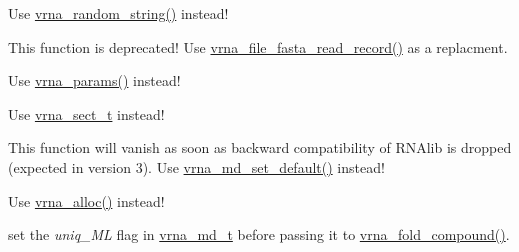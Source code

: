 \begin{DoxyRefList}
\item[\label{deprecated__deprecated000126}%
\hypertarget{deprecated__deprecated000126}{}%
Global \hyperlink{string__utils_8h_a1b95eac365a021572e1c37e5993a89be}{random\-\_\-string} (int l, const char symbols\mbox{[}\mbox{]})]Use \hyperlink{group__string__utils_ga4eeb3750dcf860b9f3158249f95dbd7f}{vrna\-\_\-random\-\_\-string()} instead!  
\item[\label{deprecated__deprecated000061}%
\hypertarget{deprecated__deprecated000061}{}%
Global \hyperlink{group__file__utils_gafd194a69af9d92b5b0412a7627ac1595}{read\-\_\-record} (char $\ast$$\ast$header, char $\ast$$\ast$sequence, char $\ast$$\ast$$\ast$rest, unsigned int options)]This function is deprecated! Use \hyperlink{group__file__utils_ga8cfb7e271efc9e1f34640acb85475639}{vrna\-\_\-file\-\_\-fasta\-\_\-read\-\_\-record()} as a replacment. 
\item[\label{deprecated__deprecated000090}%
\hypertarget{deprecated__deprecated000090}{}%
Global \hyperlink{group__energy__parameters_ga541f2cf7436e9bc939b0a49b24baf987}{scale\-\_\-parameters} (void)]Use \hyperlink{group__energy__parameters_gad0e3e7e74bdc50d1709d40c92993185e}{vrna\-\_\-params()} instead! 
\item[\label{deprecated__deprecated000045}%
\hypertarget{deprecated__deprecated000045}{}%
Global \hyperlink{group__data__structures_gaaacedee1f05d3d45aa6764eca51a8876}{sect} ]Use \hyperlink{group__data__structures_gacc9cdae790dac75a7024e7069c0d4400}{vrna\-\_\-sect\-\_\-t} instead!  
\item[\label{deprecated__deprecated000082}%
\hypertarget{deprecated__deprecated000082}{}%
Global \hyperlink{group__model__details_gabad896c3650d420f3f3ddefc69e2bceb}{set\-\_\-model\-\_\-details} (vrna\-\_\-md\-\_\-t $\ast$md)]This function will vanish as soon as backward compatibility of R\-N\-Alib is dropped (expected in version 3). Use \hyperlink{group__model__details_ga8ac6ff84936282436f822644bf841f66}{vrna\-\_\-md\-\_\-set\-\_\-default()} instead! 
\item[\label{deprecated__deprecated000150}%
\hypertarget{deprecated__deprecated000150}{}%
Global \hyperlink{utils_8h_ad7e1e137b3bf1f7108933d302a7f0177}{space} (unsigned size)]Use \hyperlink{group__utils_gaf37a0979367c977edfb9da6614eebe99}{vrna\-\_\-alloc()} instead!  
\item[\label{deprecated__deprecated000093}%
\hypertarget{deprecated__deprecated000093}{}%
Global \hyperlink{group__subopt__stochbt_gacd79b1a570e6ad9be24cb11fe8cae30a}{st\-\_\-back} ]set the {\itshape uniq\-\_\-\-M\-L} flag in \hyperlink{group__model__details_ga1f8a10e12a0a1915f2a4eff0b28ea17c}{vrna\-\_\-md\-\_\-t} before passing it to \hyperlink{group__fold__compound_ga6601d994ba32b11511b36f68b08403be}{vrna\-\_\-fold\-\_\-compound()}. 

\end{DoxyRefList}
